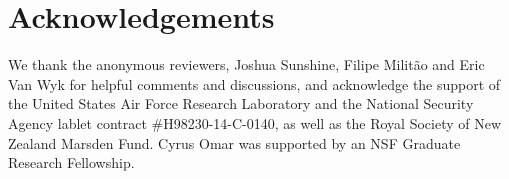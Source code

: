 



\section*{Acknowledgements}
We thank the anonymous reviewers, Joshua Sunshine, Filipe Milit\~ao and Eric Van Wyk for helpful comments and discussions, and acknowledge the support of the United States Air Force Research Laboratory and the National Security Agency lablet contract \#H98230-14-C-0140, as well as the Royal Society of New Zealand Marsden Fund. Cyrus Omar was supported by an NSF Graduate Research Fellowship.
